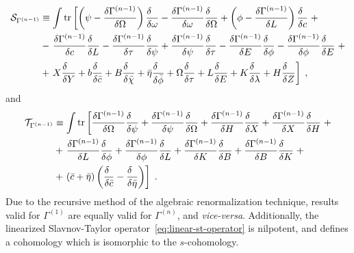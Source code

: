 \documentclass[../main.tex]{subfiles}
\begin{document}
\begin{align}
  \label{eq:linear-st-operator}
  \mathcal{S}_{\Gamma^{ (n-1) }} & \equiv \int \tr \left[\left(\psi-\frac{\delta\Gamma^{ (n-1) }}{\delta\Omega}\right)\frac{\delta\phantom{\omega}}{\delta \omega}-\frac{\delta\Gamma^{ (n-1) }}{\delta \omega}\frac{\delta\phantom{\Omega}}{\delta \Omega}+\left(\phi-\frac{\delta\Gamma^{ (n-1) }}{\delta L}\right)\frac{\delta\phantom{c}}{\delta c} \right. + \nonumber                                                                                                 \\
                                 & - \left. \frac{\delta\Gamma^{ (n-1) }}{\delta c}\frac{\delta\phantom{L}}{\delta L}-\frac{\delta\Gamma^{ (n-1) }}{\delta\tau}\frac{\delta\phantom{\psi}}{\delta\psi}+\frac{\delta\Gamma^{ (n-1) }}{\delta \psi}\frac{\delta\phantom{\tau}}{\delta \tau}-\frac{\delta\Gamma^{ (n-1) }}{\delta E}\frac{\delta\phantom{\phi}}{\delta\phi} - \frac{\delta\Gamma^{ (n-1) }}{\delta \phi}\frac{\delta\phantom{E}}{\delta E} \right. + \nonumber \\
                                 & + \left. X\frac{\delta\phantom{Y}}{\delta Y}+b\frac{\delta\phantom{\bar{c}}}{\delta\bar{c}}+B\frac{\delta\phantom{\bar{\chi}}}{\delta\bar{\chi}}+\bar{\eta}\frac{\delta\phantom{\bar{\phi}}}{\delta\bar{\phi}}+\Omega\frac{\delta\phantom{\tau}}{\delta\tau}+L\frac{\delta\phantom{E}}{\delta E}+K\frac{\delta\phantom{\lambda}}{\delta\lambda}+H\frac{\delta\phantom{Z}}{\delta Z}\right]\;,
\end{align}
and
\begin{align}
  \label{eq:linear-t-operator}
  \mathcal{T}_{\Gamma^{ (n-1) }} & \equiv \int \tr \left[\frac{\delta\Gamma^{ (n-1) }}{\delta \Omega}\frac{\delta\phantom{\psi}}{\delta \psi} + \frac{\delta\Gamma^{ (n-1) }}{\delta\psi}\frac{\delta\phantom{\Omega}}{\delta \Omega} + \frac{\delta\Gamma^{ (n-1) }}{\delta H}\frac{\delta\phantom{X}}{\delta X} + \frac{\delta\Gamma^{ (n-1) }}{\delta X}\frac{\delta\phantom{H}}{\delta H} \right. + \nonumber \\
                                 & + \left.\frac{\delta\Gamma^{ (n-1) }}{\delta L}\frac{\delta\phantom{\phi}}{\delta \phi} + \frac{\delta\Gamma^{ (n-1) }}{\delta \phi}\frac{\delta\phantom{L}}{\delta L} + \frac{\delta\Gamma^{ (n-1) }}{\delta K}\frac{\delta\phantom{B}}{\delta B} + \frac{\delta\Gamma^{ (n-1) }}{\delta B}\frac{\delta\phantom{K}}{\delta K} \right. + \nonumber                             \\
                                 & +\left.\left(\bar{c}+\bar{\eta}\right)\left(\frac{\delta\phantom{\bar{c}}}{\delta\bar{c}}-\frac{\delta\phantom{\bar{\eta}}}{\delta\bar{\eta}}\right)\right] \;.
\end{align}
Due to the recursive method of the algebraic renormalization technique, results valid for $ \Gamma^{ (1) } $ are equally valid for $ \Gamma^{ (n) } $, and \textit{vice-versa}. Additionally, the linearized Slavnov-Taylor operator~\eqref{eq:linear-st-operator} is nilpotent, and defines a cohomology which is isomorphic to the $ s $-cohomology.
\end{document}
